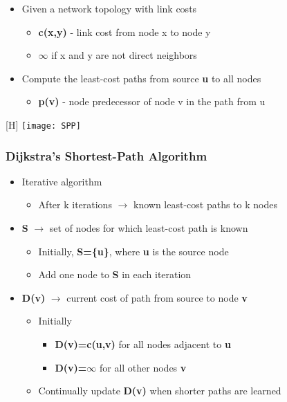 \documentclass[../resumosRCOM.tex]{subfiles}
\begin{document}
\begin{itemize}
    \item Given a network topology with link costs
    \begin{itemize}
        \item \textbf{c(x,y)} - link cost from node x to node y
        \item $\infty$ if x and y are not direct neighbors
    \end{itemize}
    \item Compute the least-cost paths from source \textbf{u} to all nodes
    \begin{itemize}
        \item \textbf{p(v)} - node predecessor of node v in the path from u
    \end{itemize}
\end{itemize}

\begin{center}[H]
    \texttt{[image: SPP]}
\end{center}

\subsubsection{Dijkstra’s Shortest-Path Algorithm}

\begin{itemize}
    \item Iterative algorithm
    \begin{itemize}
        \item After k iterations $\rightarrow$ known least-cost paths to k nodes
    \end{itemize}
    \item \textbf{S} $\rightarrow$ set of nodes for which least-cost path is known
    \begin{itemize}
        \item Initially, \textbf{S=\{u\}}, where \textbf{u} is the source node
        \item Add one node to \textbf{S} in each iteration
    \end{itemize}
    \item \textbf{D(v)} $\rightarrow$ current cost of path from source to node \textbf{v}
    \begin{itemize}
        \item Initially
        \begin{itemize}
            \item \textbf{D(v)=c(u,v)} for all nodes adjacent to \textbf{u}
            \item \textbf{D(v)=$\infty$} for all other nodes \textbf{v}
        \end{itemize}
        \item Continually update \textbf{D(v)} when shorter paths are learned
    \end{itemize}
\end{itemize}
\end{document}
